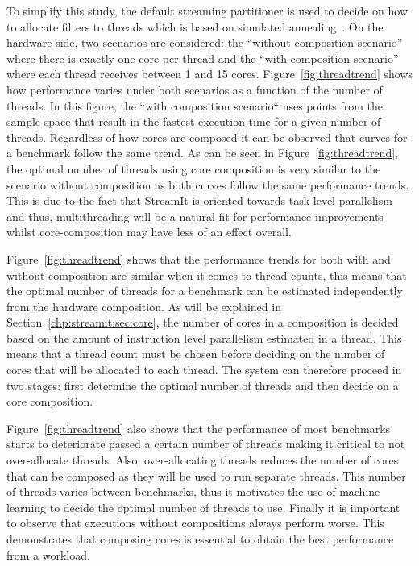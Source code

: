 To simplify this study, the default streaming partitioner is used to decide on how to allocate filters to threads which is based on simulated annealing~\cite{simulatedAnnealing1983}.
On the hardware side, two scenarios are considered: the ``without composition scenario'' where there is exactly one core per thread and the ``with composition scenario'' where each thread receives between 1 and 15 cores.
Figure~\ref{fig:threadtrend} shows how performance varies under both scenarios as a function of the number of threads.
In this figure, the ``with composition scenario`` uses points from the sample space that result in the fastest execution time for a given number of threads.
Regardless of how cores are composed it can be observed that curves for a benchmark follow the same trend.
As can be seen in Figure~\ref{fig:threadtrend}, the optimal number of threads using core composition is very similar to the scenario without composition as both curves follow the same performance trends.
This is due to the fact that StreamIt is oriented towards task-level parallelism and thus, multithreading will be a natural fit for performance improvements whilst core-composition may have less of an effect overall.

Figure~\ref{fig:threadtrend} shows that the performance trends for both with and without composition are similar when it comes to thread counts, this  means that the optimal number of threads for a benchmark can be estimated independently from the hardware composition.
As will be explained in Section~\ref{chp:streamit:sec:core}, the number of cores in a composition is decided based on the amount of instruction level parallelism estimated in a thread.
This means that a thread count must be chosen before deciding on the number of cores that will be allocated to each thread.
The system can therefore proceed in two stages: first determine the optimal number of threads and then decide on a core composition.

Figure~\ref{fig:threadtrend} also shows that the performance of most benchmarks starts to deteriorate passed a certain number of threads making it critical to not over-allocate threads.
Also, over-allocating threads reduces the number of cores that can be composed as they will be used to run separate threads.
This number of threads varies between benchmarks, thus it motivates the use of machine learning to decide the optimal number of threads to use.
Finally it is important to observe that executions without compositions always perform worse.
This demonstrates that composing cores is essential to obtain the best performance from a workload.


